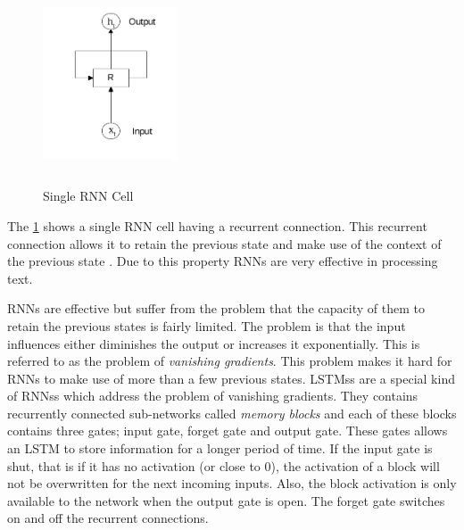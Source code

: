 \begin{figure}[!ht]
    \centering
    \includegraphics[width=4cm,height=6cm,keepaspectratio]{pics/rnn_cell.jpg}
    \captionsetup{justification=centering,margin=2cm}
    \caption{Single RNN Cell}
    \label{fig:rnn_single_cell}
\end{figure}

The \ref{fig:rnn_single_cell} shows a single \gls{RNN} cell having a recurrent connection. This recurrent connection allows it to retain the previous state and make use of the context of the previous state \cite{graves2009novel}. Due to this property \glspl{RNN} are very effective in processing text. 

\glspl{RNN} are effective but suffer from the problem that the capacity of them to retain the previous states is fairly limited. The problem is that the input influences either diminishes the output or increases it exponentially. This is referred to as the problem of \textit{vanishing gradients}\cite{hochreiter2001gradient}. This problem makes it hard for \glspl{RNN} to make use of more than a few previous states. \glspl{LSTM}s are a special kind of \glspl{RNN}s which address the problem of vanishing gradients. They contains recurrently connected sub-networks called \textit{memory blocks} and each of these blocks contains three gates; input gate, forget gate and output gate. These gates allows an \gls{LSTM} to store information for a longer period of time. If the input gate is shut, that is if it has no activation (or close to 0), the activation of a block will not be overwritten for the next incoming inputs. Also, the block activation is only available to the network when the output gate is open. The forget gate switches on and off the recurrent connections.

